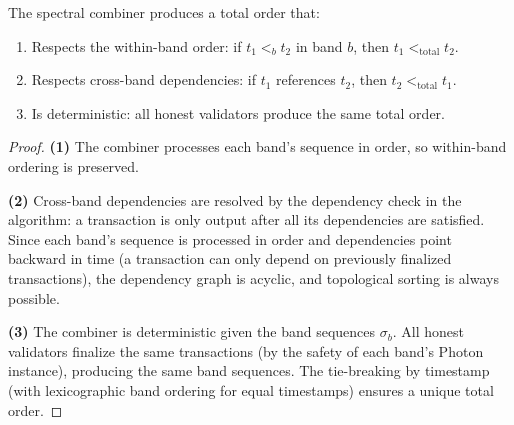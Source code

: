 \begin{theorem}
\label{thm:prism-order}
The spectral combiner produces a total order that:
\begin{enumerate}[nosep]
\item Respects the within-band order: if $t_1 <_b t_2$ in band $b$, then $t_1 <_{\text{total}} t_2$.
\item Respects cross-band dependencies: if $t_1$ references $t_2$, then $t_2 <_{\text{total}} t_1$.
\item Is deterministic: all honest validators produce the same total order.
\end{enumerate}
\end{theorem}

\begin{proof}
\textbf{(1)} The combiner processes each band's sequence in order, so within-band
ordering is preserved.

\textbf{(2)} Cross-band dependencies are resolved by the dependency check in the
algorithm: a transaction is only output after all its dependencies are satisfied.
Since each band's sequence is processed in order and dependencies point backward in
time (a transaction can only depend on previously finalized transactions), the dependency
graph is acyclic, and topological sorting is always possible.

\textbf{(3)} The combiner is deterministic given the band sequences $\sigma_b$.
All honest validators finalize the same transactions (by the safety of each band's
Photon instance), producing the same band sequences. The tie-breaking by timestamp
(with lexicographic band ordering for equal timestamps) ensures a unique total order.
\end{proof}

